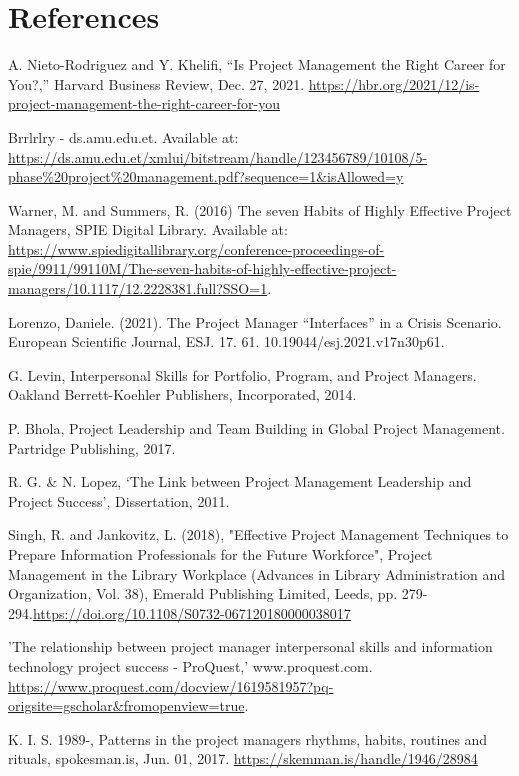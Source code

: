 \documentclass{article}
\begin{document}
\section*{References}
\vspace*{-35pt}
\renewcommand{\refname}{}
\begin{thebibliography}{99}
A. Nieto-Rodriguez and Y. Khelifi, “Is Project Management the Right Career for You?,” Harvard Business Review, Dec. 27, 2021. \url{https://hbr.org/2021/12/is-project-management-the-right-career-for-you}

Brrlrlry - ds.amu.edu.et. Available at: 
\url{https://ds.amu.edu.et/xmlui/bitstream/handle/123456789/10108/5-phase%20project%20management.pdf?sequence=1&isAllowed=y}

Warner, M. and Summers, R. (2016) The seven Habits of Highly Effective Project Managers, SPIE Digital Library. Available at: \url{https://www.spiedigitallibrary.org/conference-proceedings-of-spie/9911/99110M/The-seven-habits-of-highly-effective-project-managers/10.1117/12.2228381.full?SSO=1}. 

Lorenzo, Daniele. (2021). The Project Manager “Interfaces” in a Crisis Scenario. European Scientific Journal, ESJ. 17. 61. 10.19044/esj.2021.v17n30p61. 


G. Levin, Interpersonal Skills for Portfolio, Program, and Project Managers. Oakland Berrett-Koehler Publishers, Incorporated, 2014.


P. Bhola, Project Leadership and Team Building in Global Project Management. Partridge Publishing, 2017.


R. G. \& N. Lopez, ‘The Link between Project Management Leadership and Project Success’, Dissertation, 2011.


Singh, R. and Jankovitz, L. (2018), "Effective Project Management Techniques to Prepare Information Professionals for the Future Workforce", Project Management in the Library Workplace (Advances in Library Administration and Organization, Vol. 38), Emerald Publishing Limited, Leeds, pp. 279-294.\url{https://doi.org/10.1108/S0732-067120180000038017}


'The relationship between project manager interpersonal skills and information technology project success - ProQuest,' www.proquest.com. \url{https://www.proquest.com/docview/1619581957?pq-origsite=gscholar&fromopenview=true}.

K. I. S. 1989-, Patterns in the project managers rhythms, habits, routines and rituals, spokesman.is, Jun. 01, 2017. \url{https://skemman.is/handle/1946/28984}



\end{thebibliography}
\end{document}
